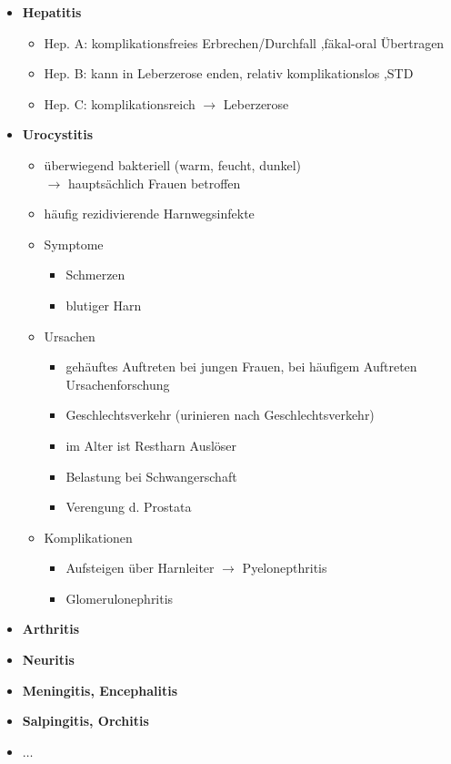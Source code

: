 \begin{itemize}
			\item \textbf{Hepatitis}
				\begin{itemize}
					\item Hep. A: komplikationsfreies Erbrechen/Durchfall ,fäkal-oral Übertragen
					\item Hep. B: kann in Leberzerose enden, relativ komplikationslos ,STD
					\item Hep. C: komplikationsreich $\rightarrow$ Leberzerose
				\end{itemize}
			\item \textbf{Urocystitis}
				\begin{itemize}
					\item überwiegend bakteriell (warm, feucht, dunkel)\\
						$\rightarrow$ hauptsächlich Frauen betroffen
					\item häufig rezidivierende Harnwegsinfekte
					\item Symptome
						\begin{itemize}
							\item Schmerzen
							\item blutiger Harn
						\end{itemize}
					\item Ursachen
						\begin{itemize}
							\item gehäuftes Auftreten bei jungen Frauen, bei häufigem Auftreten Ursachenforschung
							\item Geschlechtsverkehr (urinieren nach Geschlechtsverkehr)
							\item im Alter ist Restharn Auslöser
							\item Belastung bei Schwangerschaft
							\item Verengung d. Prostata
						\end{itemize}
					\item Komplikationen
						\begin{itemize}
							\item Aufsteigen über Harnleiter $\rightarrow$ Pyelonepthritis
							\item Glomerulonephritis
						\end{itemize}
				\end{itemize}
			\item \textbf{Arthritis}
			\item \textbf{Neuritis}
			\item \textbf{Meningitis, Encephalitis}
			\item \textbf{Salpingitis, Orchitis}
			\item \textbf{$\dots$}
	\end{itemize}